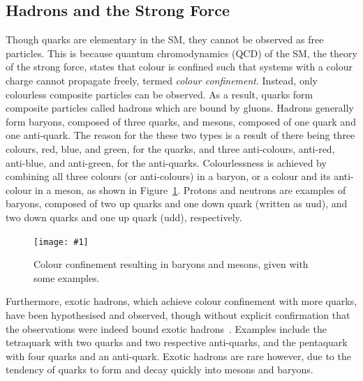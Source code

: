 \documentclass[twocolumn]{article}
\newcommand{\insertFigure}[1]{%
   \texttt{[image: \#1]}%
}
\begin{document}
\subsection{Hadrons and the Strong Force}\label{sec:hadrons}
Though quarks are elementary in the SM, they cannot be observed as free particles. This is because quantum chromodynamics (QCD) of the SM, the theory of the strong force, states that colour is confined such that systems with a colour charge cannot propagate freely, termed \textit{colour confinement}. Instead, only colourless composite particles can be observed. As a result, quarks form composite particles called hadrons which are bound by gluons. Hadrons generally form baryons, composed of three quarks, and mesons, composed of one quark and one anti-quark. The reason for the these two types is a result of there being three colours, red, blue, and green, for the quarks, and three anti-colours, anti-red, anti-blue, and anti-green, for the anti-quarks. Colourlessness is achieved by combining all three colours (or anti-colours) in a baryon, or a colour and its anti-colour in a meson, as shown in Figure~\ref{fig:colour}. Protons and neutrons are examples of baryons, composed of two up quarks and one down quark (written as uud), and two down quarks and one up quark (udd), respectively.
\begin{figure}[!h]
	\centering
	\insertFigure{Images/colour.png}
	\caption{Colour confinement resulting in baryons and mesons, given with some examples.~\cite{colour}}
	\label{fig:colour}
\end{figure}
Furthermore, exotic hadrons, which achieve colour confinement with more quarks, have been hypothesised and observed, though without explicit confirmation that the observations were indeed bound exotic hadrons~\cite{Thompson}. Examples include the tetraquark with two quarks and two respective anti-quarks, and the pentaquark with four quarks and an anti-quark. Exotic hadrons are rare however, due to the tendency of quarks to form and decay quickly into mesons and baryons.
\end{document}
